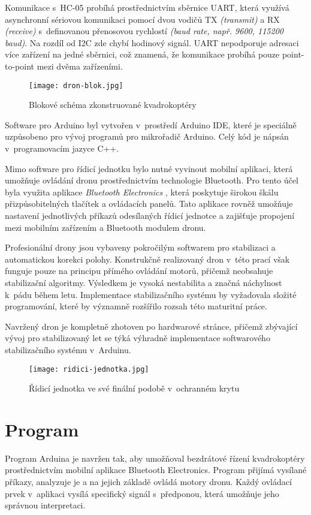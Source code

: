 \documentclass[12pt]{report}
\begin{document}
Komunikace s~HC-05 probíhá prostřednictvím sběrnice UART, která využívá asynchronní sériovou komunikaci pomocí dvou vodičů TX \textit{(transmit)} a RX \textit{(receive)} s~definovanou přenosovou rychlostí \textit{(baud rate, např. 9600, 115200 baud)}. Na rozdíl od I2C zde chybí hodinový signál. UART nepodporuje adresaci více zařízení na jedné sběrnici, což znamená, že komunikace probíhá pouze point-to-point mezi dvěma zařízeními. \cite{uart}

\begin{figure}[H]
	\centering
	\texttt{[image: dron-blok.jpg]}
	\caption{Blokové schéma zkonstruované kvadrokoptéry}
	\label{fig:dron-blok.jpg}
\end{figure}


Software pro Arduino byl vytvořen v~prostředí Arduino IDE, které je speciálně uzpůsobeno pro vývoj programů pro mikrořadič Arduino. Celý kód je nápsán v~programovacím jazyce C++.

Mimo software pro řídicí jednotku bylo nutné vyvinout mobilní aplikaci, která umožňuje ovládání dronu prostřednictvím technologie Bluetooth. Pro tento účel byla využita aplikace \textit{Bluetooth Electronics} \cite{be}, která poskytuje širokou škálu přizpůsobitelných tlačítek a ovládacích panelů. Tato aplikace rovněž umožňuje nastavení jednotlivých příkazů odesílaných řídicí jednotce a zajišťuje propojení mezi mobilním zařízením a Bluetooth modulem dronu.

Profesionální drony jsou vybaveny pokročilým softwarem pro stabilizaci a automatickou korekci polohy. Konstrukčně realizovaný dron v~této prací však funguje pouze na principu přímého ovládání motorů, přičemž neobsahuje stabilizační algoritmy. Výsledkem je vysoká nestabilita a značná náchylnost k~pádu během letu. Implementace stabilizačního systému by vyžadovala složité programování, které by významně rozšířilo rozsah této maturitní práce.

Navržený dron je kompletně zhotoven po hardwarové stránce, přičemž zbývající vývoj pro stabilizovaný let se týká výhradně implementace softwarového stabilizačního systému v~Arduinu.

\begin{figure}[H]
	\centering
	\texttt{[image: ridici-jednotka.jpg]}
	\caption{Řídicí jednotka ve své finální podobě v~ochranném krytu}
	\label{fig:ridici-jednotka.jpg}
\end{figure}

\chapter[Program]{Program}
Program Arduina je navržen tak, aby umožňoval bezdrátové řízení kvadrokoptéry prostřednictvím mobilní aplikace Bluetooth Electronics. Program přijímá vysílané příkazy, analyzuje je a na jejich základě ovládá motory dronu. Každý ovládací prvek v~aplikaci vysílá specifický signál s~předponou, která umožňuje jeho správnou interpretaci.
\end{document}
